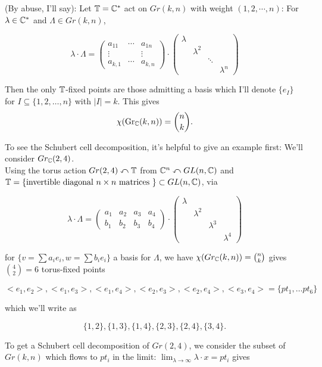 \documentclass{amsart}
\begin{document}
(By abuse, I'll say): Let $\mathbb{T}=\mathbb{C}^*$ act on $Gr(k,n)$ with weight $(1,2,\cdots, n)$: For $\lambda\in \mathbb{C}^*$ and $\Lambda \in Gr(k,n)$, 

\[ \lambda \cdot \Lambda = \left(\begin{matrix}  a_{11} & \cdots & a_{1n}\\ \vdots & & \vdots \\ a_{k,1} & \cdots & a_{k,n} \end{matrix}\right) \cdot \left( \begin{matrix} \lambda & & & \\ & \lambda^2 & &  \\ & & \ddots  & \\ & & &  \lambda^n \end{matrix} \right) \]

Then the only $\mathbb{T}$-fixed points are those admitting a basis which I'll denote $\{e_I\}$ for $I\subseteq \{1,2,\dots, n\}$ with $|I|=k$. This gives \[ \chi(\text{Gr}_{\mathbb{C}}(k,n)) = \binom{n}{k}. \]

To see the Schubert cell decomposition, it's helpful to give an example first: We'll consider $Gr_{\mathbb{C}}(2,4)$. \\

Using the torus action $Gr(2,4) \curvearrowleft \mathbb{T}$ from $\mathbb{C}^n \curvearrowleft GL(n,\mathbb{C})$ and $\mathbb{T} = \{\text{invertible diagonal }n\times n \text{ matrices } \} \subset GL(n,\mathbb{C})$, via 

\[ \lambda \cdot \Lambda = \left( \begin{matrix} a_1 & a_2 & a_3 & a_4 \\ b_1 & b_2 & b_3 & b_4 \end{matrix}\right) \cdot \left( \begin{matrix} \lambda & & & \\ & \lambda^2 & & \\ & & \lambda^3 & \\ & & & \lambda^4 \end{matrix}\right) \] 

for $\{v = \sum a_i e_i, w= \sum b_i e_i\}$ a basis for $\Lambda$, we have $\chi(Gr_{\mathbb{C}}(k,n))=\binom{n}{k}$ gives $\binom{4}{2}=6$ torus-fixed points 

\[ < e_1, e_2>, <e_1,e_3>, <e_1,e_4>, <e_2,e_3>, <e_2,e_4>, <e_3,e_4> = \{pt_1, \dots pt_6\} \]

which we'll write as

\[ \{1,2\}, \{1,3\}, \{1,4\}, \{2,3\}, \{2,4\}, \{3,4\}. \]

To get a Schubert cell decomposition of $Gr(2,4)$, we consider the subset of $Gr(k,n)$ which flows to $pt_i$ in the limit: $\lim_{\lambda\rightarrow\infty} \lambda \cdot x = pt_i$ gives 
\end{document}
